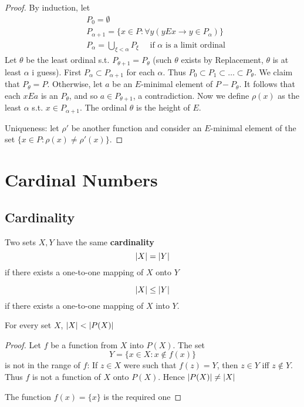 \documentclass[11pt]{article}
\begin{document}
\begin{proof}
By induction, let
\begin{align*}
&P_0=\emptyset\\
&P_{\alpha+1}=\{x\in P:\forall y(yEx\to y\in P_\alpha)\}\\
&P_\alpha=\bigcup_{\xi<\alpha}P_\xi\quad\text{ if $\alpha$ is a limit ordinal}
\end{align*}
Let \(\theta\) be the least ordinal s.t. \(P_{\theta+1}=P_\theta\) (such \(\theta\) exists by Replacement, \(\theta\) is at least
\(\alpha\) i guess).
First \(P_\alpha\subset P_{\alpha+1}\) for each \(\alpha\). Thus \(P_0\subset P_1\subset\dots\subset P_\theta\). We claim that \(P_\theta=P\). Otherwise,
let \(a\) be an \(E\)-minimal element of \(P-P_\theta\). It follows that each \(xEa\) is an \(P_\theta\),
and so \(a\in P_{\theta+1}\), a contradiction. Now we define \(\rho(x)\) as the least \(\alpha\)
s.t. \(x\in P_{\alpha+1}\). The ordinal \(\theta\) is the height of \(E\).

Uniqueness: let \(\rho'\) be another function and consider an \(E\)-minimal element of the
set \(\{x\in P:\rho(x)\neq\rho'(x)\}\).
\end{proof}

\section{Cardinal Numbers}
\label{sec:orge017c8b}

\subsection{Cardinality}
\label{sec:org0addabf}
Two sets \(X,Y\) have the same \textbf{cardinality}
\begin{equation*}
\abs{X}=\abs{Y}
\end{equation*}
if there exists a one-to-one mapping of \(X\) onto \(Y\)

\begin{equation*}
\abs{X}\le\abs{Y}
\end{equation*}
if there exists a one-to-one mapping of \(X\) into \(Y\).

\begin{theorem}[Cantor]
\label{thm3.1}
For every set \(X\), \(\abs{X}<\abs{P(X)}\)
\end{theorem}

\begin{proof}
Let \(f\) be a function from \(X\) into \(P(X)\). The set
\begin{equation*}
Y=\{x\in X:x\not\in f(x)\}
\end{equation*}
is not in the range of \(f\): If \(z\in X\) were such that \(f(z)=Y\), then \(z\in Y\)
iff \(z\not\in Y\). Thus \(f\) is not a function of \(X\) onto \(P(X)\).
Hence \(\abs{P(X)}\neq\abs{X}\)

The function \(f(x)=\{x\}\) is the required one
\end{proof}
\end{document}

